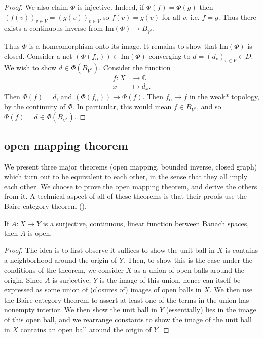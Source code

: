 \documentclass[12pt]{article}
\begin{document}
\begin{refsection}
\begin{proof}
	We also claim $\Phi$ is injective. Indeed, if $\Phi(f)=\Phi(g)$ then $(f(v))_{v\in V} = (g(v))_{v\in V}$ so $f(v)=g(v)$ for all $v$, i.e. $f=g$. Thus there exists a continuous inverse from $\text{Im}(\Phi)\to B_{V^\ast}$.

	Thus $\Phi$ is a homeomorphism onto its image. It remains to show that $\text{Im}(\Phi)$ is closed. Consider a net $(\Phi(f_\alpha))\subset\text{Im}(\Phi)$ converging to $d=(d_v)_{v\in V}\in D$. We wish to show $d\in \Phi(B_{V^\ast})$. Consider the function
	\begin{align*}
		f: X &\to \mathbb{C} \\
		x &\mapsto d_x.
	\end{align*}
	Then $\Phi(f)=d$, and $(\Phi(f_\alpha)) \to \Phi(f)$. Then $f_\alpha \to f$ in the weak* topology, by the continuity of $\Phi$. In particular, this would mean $f\in B_{V^\ast}$, and so $\Phi(f)=d\in \Phi(B_{V^\ast})$.  
\end{proof}


\subsection{open mapping theorem} %

We present three major theorems (open mapping, bounded inverse, closed graph) which turn out to be equivalent to each other, in the sense that they all imply each other. We choose to prove the open mapping theorem, and derive the others from it. A technical aspect of all of these theorems is that their proofs use the Baire category theorem ().

\begin{theorem}
\label{thm_omt}
	If $A:X\to Y$ is a surjective, continuous, linear function between Banach spaces, then $A$ is open.
\end{theorem}
\begin{proof}
	The idea is to first observe it suffices to show the unit ball in $X$ is contains a neighborhood around the origin of $Y$. Then, to show this is the case under the conditions of the theorem, we consider $X$ as a union of open balls around the origin. Since $A$ is surjective, $Y$ is the image of this union, hence can itself be expressed as some union of (closures of) images of open balls in $X$. We then use the Baire category theorem to assert at least one of the terms in the union has nonempty interior. We then show the unit ball in $Y$ (essentially) lies in the image of this open ball, and we rearrange constants to show the image of the unit ball in $X$ contains an open ball around the origin of $Y$.


\end{proof}
\end{refsection}
\end{document}
